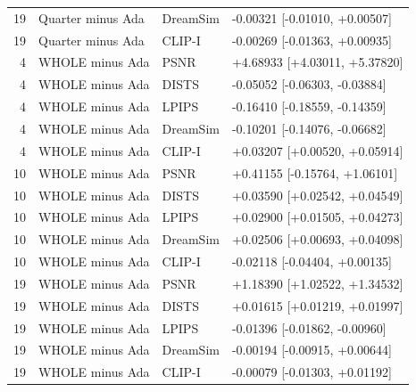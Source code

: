 \documentclass[10pt,letterpaper]{article}
\begin{document}
\begin{longtable}{@{}rlll@{}}
19 & Quarter minus Ada & DreamSim & -0.00321 [-0.01010, +0.00507]\\
19 & Quarter minus Ada & CLIP-I & -0.00269 [-0.01363, +0.00935]\\
4 & WHOLE minus Ada & PSNR & +4.68933 [+4.03011, +5.37820]\\
4 & WHOLE minus Ada & DISTS & -0.05052 [-0.06303, -0.03884]\\
4 & WHOLE minus Ada & LPIPS & -0.16410 [-0.18559, -0.14359]\\
4 & WHOLE minus Ada & DreamSim & -0.10201 [-0.14076, -0.06682]\\
4 & WHOLE minus Ada & CLIP-I & +0.03207 [+0.00520, +0.05914]\\
10 & WHOLE minus Ada & PSNR & +0.41155 [-0.15764, +1.06101]\\
10 & WHOLE minus Ada & DISTS & +0.03590 [+0.02542, +0.04549]\\
10 & WHOLE minus Ada & LPIPS & +0.02900 [+0.01505, +0.04273]\\
10 & WHOLE minus Ada & DreamSim & +0.02506 [+0.00693, +0.04098]\\
10 & WHOLE minus Ada & CLIP-I & -0.02118 [-0.04404, +0.00135]\\
19 & WHOLE minus Ada & PSNR & +1.18390 [+1.02522, +1.34532]\\
19 & WHOLE minus Ada & DISTS & +0.01615 [+0.01219, +0.01997]\\
19 & WHOLE minus Ada & LPIPS & -0.01396 [-0.01862, -0.00960]\\
19 & WHOLE minus Ada & DreamSim & -0.00194 [-0.00915, +0.00644]\\
19 & WHOLE minus Ada & CLIP-I & -0.00079 [-0.01303, +0.01192]\\
\bottomrule\end{longtable}
\end{document}

